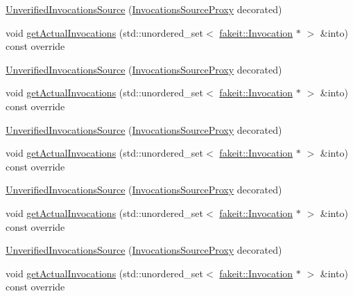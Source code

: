 \begin{DoxyCompactItemize}
\item 
\mbox{\hyperlink{structfakeit_1_1UnverifiedInvocationsSource_a572c6af2dd898eee740fc9e412180d57}{Unverified\+Invocations\+Source}} (\mbox{\hyperlink{structfakeit_1_1InvocationsSourceProxy}{Invocations\+Source\+Proxy}} decorated)
\item 
void \mbox{\hyperlink{structfakeit_1_1UnverifiedInvocationsSource_a889468fefa500d0f7f524f8235a67b0c}{get\+Actual\+Invocations}} (std\+::unordered\+\_\+set$<$ \mbox{\hyperlink{structfakeit_1_1Invocation}{fakeit\+::\+Invocation}} $\ast$ $>$ \&into) const override
\item 
\mbox{\hyperlink{structfakeit_1_1UnverifiedInvocationsSource_a572c6af2dd898eee740fc9e412180d57}{Unverified\+Invocations\+Source}} (\mbox{\hyperlink{structfakeit_1_1InvocationsSourceProxy}{Invocations\+Source\+Proxy}} decorated)
\item 
void \mbox{\hyperlink{structfakeit_1_1UnverifiedInvocationsSource_a889468fefa500d0f7f524f8235a67b0c}{get\+Actual\+Invocations}} (std\+::unordered\+\_\+set$<$ \mbox{\hyperlink{structfakeit_1_1Invocation}{fakeit\+::\+Invocation}} $\ast$ $>$ \&into) const override
\item 
\mbox{\hyperlink{structfakeit_1_1UnverifiedInvocationsSource_a572c6af2dd898eee740fc9e412180d57}{Unverified\+Invocations\+Source}} (\mbox{\hyperlink{structfakeit_1_1InvocationsSourceProxy}{Invocations\+Source\+Proxy}} decorated)
\item 
void \mbox{\hyperlink{structfakeit_1_1UnverifiedInvocationsSource_a889468fefa500d0f7f524f8235a67b0c}{get\+Actual\+Invocations}} (std\+::unordered\+\_\+set$<$ \mbox{\hyperlink{structfakeit_1_1Invocation}{fakeit\+::\+Invocation}} $\ast$ $>$ \&into) const override
\item 
\mbox{\hyperlink{structfakeit_1_1UnverifiedInvocationsSource_a572c6af2dd898eee740fc9e412180d57}{Unverified\+Invocations\+Source}} (\mbox{\hyperlink{structfakeit_1_1InvocationsSourceProxy}{Invocations\+Source\+Proxy}} decorated)
\item 
void \mbox{\hyperlink{structfakeit_1_1UnverifiedInvocationsSource_a889468fefa500d0f7f524f8235a67b0c}{get\+Actual\+Invocations}} (std\+::unordered\+\_\+set$<$ \mbox{\hyperlink{structfakeit_1_1Invocation}{fakeit\+::\+Invocation}} $\ast$ $>$ \&into) const override
\item 
\mbox{\hyperlink{structfakeit_1_1UnverifiedInvocationsSource_a572c6af2dd898eee740fc9e412180d57}{Unverified\+Invocations\+Source}} (\mbox{\hyperlink{structfakeit_1_1InvocationsSourceProxy}{Invocations\+Source\+Proxy}} decorated)
\item 
void \mbox{\hyperlink{structfakeit_1_1UnverifiedInvocationsSource_a889468fefa500d0f7f524f8235a67b0c}{get\+Actual\+Invocations}} (std\+::unordered\+\_\+set$<$ \mbox{\hyperlink{structfakeit_1_1Invocation}{fakeit\+::\+Invocation}} $\ast$ $>$ \&into) const override
\end{DoxyCompactItemize}


